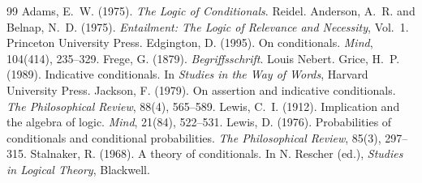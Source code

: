 \documentclass{situationist-preprint}
\begin{document}
\begin{thebibliography}{99}\small
{} Adams, E.~W. (1975). \emph{The Logic of Conditionals}. Reidel.
 Anderson, A.~R. and Belnap, N.~D. (1975). \emph{Entailment: The Logic of Relevance and Necessity}, Vol.~1. Princeton University Press.
 Edgington, D. (1995). On conditionals. \emph{Mind}, 104(414), 235--329.
 Frege, G. (1879). \emph{Begriffsschrift}. Louis Nebert.
 Grice, H.~P. (1989). Indicative conditionals. In \emph{Studies in the Way of Words}, Harvard University Press.
 Jackson, F. (1979). On assertion and indicative conditionals. \emph{The Philosophical Review}, 88(4), 565--589.
 Lewis, C.~I. (1912). Implication and the algebra of logic. \emph{Mind}, 21(84), 522--531.
 Lewis, D. (1976). Probabilities of conditionals and conditional probabilities. \emph{The Philosophical Review}, 85(3), 297--315.
 Stalnaker, R. (1968). A theory of conditionals. In N. Rescher (ed.), \emph{Studies in Logical Theory}, Blackwell.
\end{thebibliography}
\end{document}
